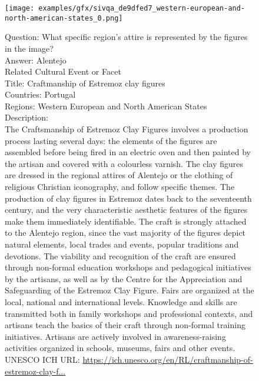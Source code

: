 \begin{figure}[H]
\begin{tcolorbox}[colback=gray!5!white,colframe=black!75!black,fonttitle=\bfseries\scriptsize,fontupper=\ttfamily\footnotesize,segmentation style={solid, black!30}]
  \begin{center}
    \begin{minipage}{0.5\linewidth}
      \centering
      \texttt{[image: examples/gfx/sivqa\_de9dfed7\_western-european-and-north-american-states\_0.png]}
      {\captionsetup{labelformat=empty}}
    \end{minipage}\hfill
  \end{center}
  {\Large{Question:}} {\large{What specific region's attire is represented by the figures in the image?}}\\
  {\Large{Answer:}} {\large{Alentejo}}\\
   \tcbline
  {\Large{Related Cultural Event or Facet}}\\[4mm]
  {\normalsize{Title:}} {\normalsize{Craftmanship of Estremoz clay figures}}\\
  {\normalsize{Countries:}} Portugal\\
  {\normalsize{Regions:}} Western European and North American States\\
  {\normalsize{Description:}}\\
  The Craftsmanship of Estremoz Clay Figures involves a production process lasting several days: the elements of the figures are assembled before being fired in an electric oven and then painted by the artisan and covered with a colourless varnish. The clay figures are dressed in the regional attires of Alentejo or the clothing of religious Christian iconography, and follow specific themes. The production of clay figures in Estremoz dates back to the seventeenth century, and the very characteristic aesthetic features of the figures make them immediately identifiable. The craft is strongly attached to the Alentejo region, since the vast majority of the figures depict natural elements, local trades and events, popular traditions and devotions. The viability and recognition of the craft are ensured through non-formal education workshops and pedagogical initiatives by the artisans, as well as by the Centre for the Appreciation and Safeguarding of the Estremoz Clay Figure. Fairs are organized at the local, national and international levels. Knowledge and skills are transmitted both in family workshops and professional contexts, and artisans teach the basics of their craft through non-formal training initiatives. Artisans are actively involved in awareness-raising activities organized in schools, museums, fairs and other events.\\[2mm]
  {\normalsize{UNESCO ICH URL:}} \href{https://ich.unesco.org/en/RL/craftmanship-of-estremoz-clay-figures-01279}{https://ich.unesco.org/en/RL/craftmanship-of-estremoz-clay-f...}
\end{tcolorbox}
\end{figure}